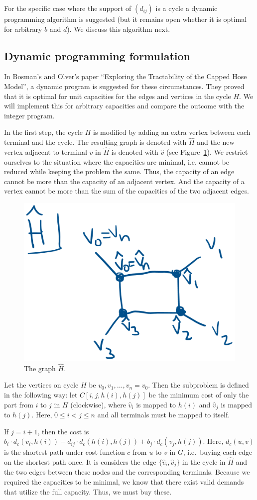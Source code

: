 For the specific case where the support of $(d_{ij})$ is a cycle a dynamic programming algorithm is suggested (but it remains open whether it is optimal for arbitrary $b$ and $d$).
We discuss this algorithm next.

\subsection{Dynamic programming formulation}
In Bosman's and Olver's paper ``Exploring the Tractability of the Capped Hose Model'', a dynamic program is suggested for these circumstances.
They proved that it is optimal for unit capacities for the edges and vertices in the cycle $H$.
We will implement this for arbitrary capacities and compare the outcome with the integer program.

In the first step, the cycle $H$ is modified by adding an extra vertex between each terminal and the cycle.
The resulting graph is denoted with $\hat H$ and the new vertex adjacent to terminal $v$ in $\hat H$ is denoted with $\hat v$ (see Figure~\ref{fig:hdak}).
We restrict ourselves to the situation where the capacities are minimal, i.e. cannot be reduced while keeping the problem the same.
Thus, the capacity of an edge cannot be more than the capacity of an adjacent vertex.
And the capacity of a vertex cannot be more than the sum of the capacities of the two adjacent edges.

\begin{figure}
    \centering
    \includegraphics[width=.35\textwidth]{hdak.png}
    \caption{The graph $\hat H$.} \label{fig:hdak}
\end{figure}

Let the vertices on cycle $H$ be $v_0, v_1, \dots, v_n = v_0$.
Then the subproblem is defined in the following way: let $C[i, j, h(i), h(j)]$ be the minimum cost of only the part from $i$ to $j$ in $H$ (clockwise), where $\hat v_i$ is mapped to $h(i)$ and $\hat v_j$ is mapped to $h(j)$.
Here, $0 \le i < j \le n$ and all terminals must be mapped to itself.

If $j = i + 1$, then the cost is $b_i \cdot d_c(v_i, h(i)) + d_{ij} \cdot d_c(h(i), h(j)) + b_j \cdot d_c(v_j, h(j))$.
Here, $d_c(u, v)$ is the shortest path under cost function $c$ from $u$ to $v$ in $G$, i.e.\ buying each edge on the shortest path once.
It is considers the edge $\{\hat v_i, \hat v_j\}$ in the cycle in $\hat H$ and the two edges between these nodes and the corresponding terminals.
Because we required the capacities to be minimal, we know that there exist valid demands that utilize the full capacity.
Thus, we must buy these.

